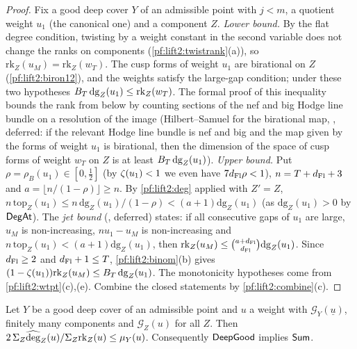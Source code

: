 \begin{proof}
Fix a good deep cover $Y$ of an admissible point with $j<m$, a quotient weight $u_1$ (the canonical one) and a
component $Z$. \emph{Lower bound.} By the flat degree condition, twisting by a weight constant in the second variable
does not change the ranks on components (\cref{pf:lift2:twistrank}(a)), so
$\mathrm{rk}_Z(u_M)=\mathrm{rk}_Z(w_T)$. The cusp forms of weight $u_1$ are birational on $Z$
(\cref{pf:lift2:biron12}), and the weights satisfy
the large-gap condition; under these two hypotheses $B_T\,\mathrm{dg}_Z(u_1)\le\mathrm{rk}_Z(w_T)$. The formal
proof of this inequality bounds the rank from below by counting sections of the nef and big Hodge line bundle on a
resolution of the image (Hilbert--Samuel for the birational map,
, deferred: if the relevant Hodge line bundle is nef
and big and the map given by the forms of weight $u_1$ is birational, then the dimension of the space of cusp forms
of weight $w_T$ on $Z$ is at least $B_T\,\mathrm{dg}_Z(u_1)$).
\emph{Upper bound.} Put $\rho=\rho_B(u_1)\in[0,\frac12]$ (by $\zeta(u_1)<1$ we even have $7d_{\mathrm{Fl}}\rho<1$),
$n=T+d_{\mathrm{Fl}}+3$ and $a=\lfloor n/(1-\rho)\rfloor\ge n$. By \cref{pf:lift2:deg} applied with $Z'=Z$,
$n\,\mathrm{top}_Z(u_1)\le n\,\mathrm{dg}_Z(u_1)/(1-\rho)<(a+1)\mathrm{dg}_Z(u_1)$ (as $\mathrm{dg}_Z(u_1)>0$ by
$\mathsf{DegAt}$). The \emph{jet bound} (, deferred) states: if all
consecutive gaps of $u_1$ are large, $u_M$ is non-increasing, $n u_1-u_M$ is non-increasing and $n\,\mathrm{top}_Z(u_1)<
(a+1)\mathrm{dg}_Z(u_1)$, then $\mathrm{rk}_Z(u_M)\le\binom{a+d_{\mathrm{Fl}}}{d_{\mathrm{Fl}}}\mathrm{dg}_Z(u_1)$. Since
$d_{\mathrm{Fl}}\ge2$ and $d_{\mathrm{Fl}}+1\le T$, \cref{pf:lift2:binom}(b) gives
$(1-\zeta(u_1))\mathrm{rk}_Z(u_M)\le B_T\,\mathrm{dg}_Z(u_1)$. The monotonicity hypotheses come from
\cref{pf:lift2:wtpt}(c),(e). Combine the closed statements by
\cref{pf:lift2:combine}(c).
\end{proof}

\begin{proposition}\label{pf:lift2:sum}
Let $Y$ be a good deep cover of an admissible point and $u$ a weight with $\mathcal G_Y(\underline u)$, finitely
many components and $\mathcal G_Z(u)$ for all $Z$. Then
$2\,\Sigma_Z\widehat{\operatorname{deg}}_Z(u)/\Sigma_Z\mathrm{rk}_Z(u)\le\mu_Y(u)$. Consequently $\mathsf{DeepGood}$ implies
$\mathsf{Sum}$.
\end{proposition}

